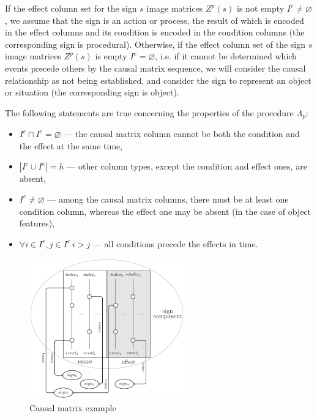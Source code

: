 \documentclass[review]{elsarticle}
\begin{document}
If the effect column set for the sign  $s$ image matrices $Z^p(s)$ is not empty $I^e \not=\varnothing$, we assume that the sign is an action or process, the result of which is encoded in the effect columns and its condition is encoded in the condition columns (the corresponding sign is procedural). Otherwise, if the effect column set of the sign $s$ image matrices $Z^p(s)$ is empty  $I^e=\varnothing$, i.e. if it cannot be determined which events precede others by the causal matrix sequence, we will consider the causal relationship as not being established, and consider the sign to represent an object or situation (the corresponding sign is object).

The following statements are true concerning the properties of the procedure $\Lambda_p$:
\begin{itemize}
	\item $I^c\cap I^e=\varnothing$ --- the causal matrix column cannot be both the condition and the effect at the same time,
	\item $|I^c\cup I^e|=h$ --- other column types, except the condition and effect ones, are absent,
	\item $I^c\not = \varnothing$ --- among the causal matrix columns, there must be at least one condition column, whereas the effect one may be absent (in the case of object features),
	\item $\forall i\in I^e, j\in I^c\ i>j$ --- all conditions precede the effects in time.
\end{itemize}

\begin{figure}[H]
	\centering
	\includegraphics[width=0.6\textwidth]{causnet/caus_matr}
	\caption{Causal matrix example}	
	\label{fig:caus_matr}	
\end{figure}
\end{document}
